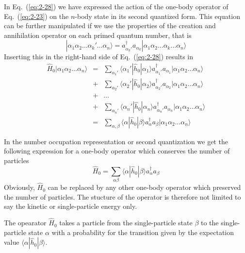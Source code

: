 \documentclass[graybox,sectrefs,envcountresetchap,open=right]{svmonodo}
\begin{document}
In Eq.~(\ref{eq:2-28}) 
we have expressed the action of the one-body operator
of Eq.~(\ref{eq:2-23}) on the  $n$-body state in its second quantized form.
This equation can be further manipulated if we use the properties of the creation and annihilation operator
on each primed quantum number, that is
\begin{equation}
	|\alpha_1\alpha_2 \dots \alpha_k' \dots \alpha_{n}\rangle = 
		a_{\alpha_k'}^{\dagger}  a_{\alpha_k} |\alpha_1\alpha_2 \dots \alpha_k \dots \alpha_{n}\rangle \label{eq:2-29}
\end{equation}
Inserting this in the right-hand side of Eq.~(\ref{eq:2-28}) results in
\begin{eqnarray}
	\hat{H}_0|\alpha_1\alpha_2 \dots \alpha_{n}\rangle &=& \sum_{\alpha_1'}\langle \alpha_1'|\hat{h}_0|\alpha_1\rangle
		a_{\alpha_1'}^{\dagger}  a_{\alpha_1} |\alpha_1\alpha_2 \dots \alpha_{n}\rangle \nonumber \\
	&+& \sum_{\alpha_2'} \langle \alpha_2'|\hat{h}_0|\alpha_2\rangle
		a_{\alpha_2'}^{\dagger}  a_{\alpha_2} |\alpha_1\alpha_2 \dots \alpha_{n}\rangle \nonumber \\
	&+& \dots \nonumber \\
	&+& \sum_{\alpha_n'} \langle \alpha_n'|\hat{h}_0|\alpha_n\rangle
		a_{\alpha_n'}^{\dagger}  a_{\alpha_n} |\alpha_1\alpha_2 \dots \alpha_{n}\rangle \nonumber \\
	&=& \sum_{\alpha, \beta} \langle \alpha|\hat{h}_0|\beta\rangle a_\alpha^{\dagger} a_\beta 
		|\alpha_1\alpha_2 \dots \alpha_{n}\rangle \label{eq:2-30a}
\end{eqnarray}





In the number occupation representation or second quantization we get the following expression for a one-body 
operator which conserves the number of particles
\begin{equation}
	\hat{H}_0 = \sum_{\alpha\beta} \langle \alpha|\hat{h}_0|\beta\rangle a_\alpha^{\dagger} a_\beta \label{eq:2-30b}
\end{equation}
Obviously, $\hat{H}_0$ can be replaced by any other one-body  operator which preserved the number
of particles. The stucture of the operator is therefore not limited to say the kinetic or single-particle energy only.

The opearator $\hat{H}_0$ takes a particle from the single-particle state $\beta$  to the single-particle state $\alpha$ 
with a probability for the transition given by the expectation value $\langle \alpha|\hat{h}_0|\beta\rangle$.
\end{document}
